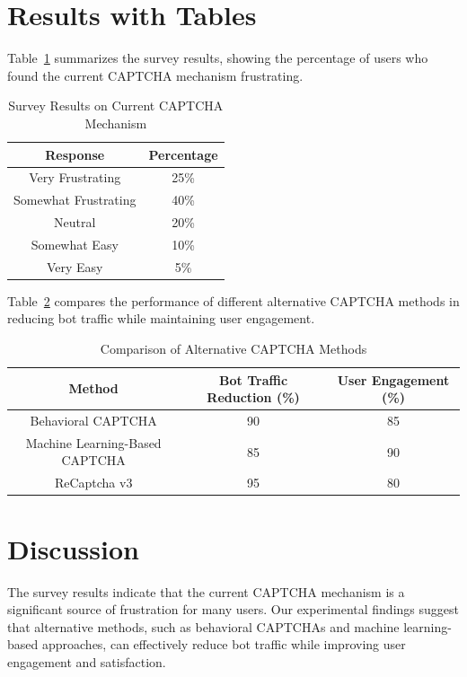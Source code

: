 \documentclass{article}
\begin{document}
\section{Results with Tables}
Table~\ref{tab:survey_results} summarizes the survey results, showing the percentage of users who found the current CAPTCHA mechanism frustrating.

\begin{table}[ht]
    \centering
    \begin{tabular}{|c|c|}
        \hline
        \textbf{Response} & \textbf{Percentage} \\
        \hline
        Very Frustrating & 25\% \\
        Somewhat Frustrating & 40\% \\
        Neutral & 20\% \\
        Somewhat Easy & 10\% \\
        Very Easy & 5\% \\
        \hline
    \end{tabular}
    \caption{Survey Results on Current CAPTCHA Mechanism}
    \label{tab:survey_results}
\end{table}

Table~\ref{tab:alternative_methods} compares the performance of different alternative CAPTCHA methods in reducing bot traffic while maintaining user engagement.

\begin{table}[ht]
    \centering
    \begin{tabular}{|c|c|c|}
        \hline
        \textbf{Method} & \textbf{Bot Traffic Reduction (\%)} & \textbf{User Engagement (\%)} \\
        \hline
        Behavioral CAPTCHA & 90 & 85 \\
        Machine Learning-Based CAPTCHA & 85 & 90 \\
        ReCaptcha v3 & 95 & 80 \\
        \hline
    \end{tabular}
    \caption{Comparison of Alternative CAPTCHA Methods}
    \label{tab:alternative_methods}
\end{table}

\section{Discussion}
The survey results indicate that the current CAPTCHA mechanism is a significant source of frustration for many users. Our experimental findings suggest that alternative methods, such as behavioral CAPTCHAs and machine learning-based approaches, can effectively reduce bot traffic while improving user engagement and satisfaction.
\end{document}
